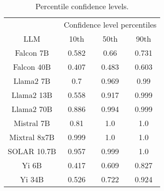 \begin{table*}
\centering
\begin{tabular}{c|c|c|c}
& \multicolumn{3}{c}{Confidence level percentiles} \\ 
LLM & 10th & 50th & 90th\\ \hline
Falcon 7B & 0.582 & 0.66 & 0.731\\
Falcon 40B & 0.407 & 0.483 & 0.603\\
Llama2 7B & 0.7 & 0.969 & 0.99\\
Llama2 13B & 0.558 & 0.917 & 0.999\\
Llama2 70B & 0.886 & 0.994 & 0.999\\
Mistral 7B & 0.81 & 1.0 & 1.0\\
Mixtral 8x7B & 0.999 & 1.0 & 1.0\\
SOLAR 10.7B & 0.957 & 0.999 & 1.0\\
Yi 6B & 0.417 & 0.609 & 0.827\\
Yi 34B & 0.526 & 0.722 & 0.924\\
\hline
\end{tabular}
\caption{Percentile confidence levels.}
\label{tab:percentile_conf}
\end{table*}
